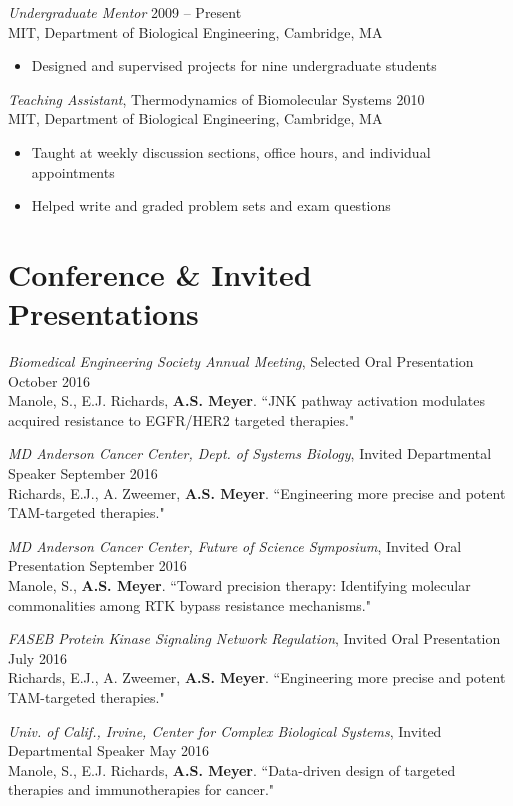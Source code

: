 \documentclass[11pt]{res}
\begin{document}
\begin{resume}
{\sl Undergraduate Mentor} \hfill 2009 -- Present \\
MIT, Department of Biological Engineering, Cambridge, MA
\begin{itemize}
\item Designed and supervised projects for nine undergraduate students
\end{itemize}
	
\clearpage
{\sl Teaching Assistant}, Thermodynamics of Biomolecular Systems \hfill 2010 \\
MIT, Department of Biological Engineering, Cambridge, MA
\begin{itemize}
\item Taught at weekly discussion sections, office hours, and individual appointments
\item Helped write and graded problem sets and exam questions
\end{itemize}

\section{Conference \& Invited Presentations}

{\sl Biomedical Engineering Society Annual Meeting}, Selected Oral Presentation \hfill October 2016 \\
Manole, S., E.J. Richards, {\bf A.S. Meyer}. ``JNK pathway activation modulates acquired resistance to EGFR/HER2 targeted therapies."

{\sl MD Anderson Cancer Center, Dept. of Systems Biology}, Invited Departmental Speaker \hfill September 2016 \\
Richards, E.J., A. Zweemer, {\bf A.S. Meyer}. ``Engineering more precise and potent TAM-targeted therapies."

{\sl MD Anderson Cancer Center, Future of Science Symposium}, Invited Oral Presentation \hfill September 2016 \\
Manole, S., {\bf A.S. Meyer}. ``Toward precision therapy: Identifying molecular commonalities among RTK bypass resistance mechanisms."

{\sl FASEB Protein Kinase Signaling Network Regulation}, Invited Oral Presentation \hfill July 2016 \\
Richards, E.J., A. Zweemer, {\bf A.S. Meyer}. ``Engineering more precise and potent TAM-targeted therapies."

{\sl Univ. of Calif., Irvine, Center for Complex Biological Systems}, Invited Departmental Speaker \hfill May 2016 \\
Manole, S., E.J. Richards, {\bf A.S. Meyer}. ``Data-driven design of targeted therapies and immunotherapies for cancer."


\end{resume}
\end{document}
